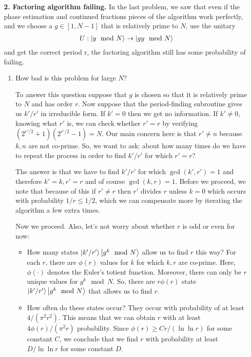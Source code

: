 \documentclass{article}
\theoremstyle{definition}
\begin{document}
\newpage

\noindent \textbf{2. Factoring algorithm failing.} In the last problem, we saw that even if the phase estimation and continued fractions pieces of the algorithm work perfectly, and we choose a  $g\in [1,N-1]$ that is relatively prime to $N$, use the unitary
\begin{align*}
U : \ket{ y \mod N}  \to \ket{gy \mod N}
\end{align*}
and get the correct period r, the factoring algorithm still has some probability of failing.

\begin{enumerate}[label=(\alph*)]

\item How bad is this problem for large $N$?

\noindent To answer this question suppose that $g$ is chosen so that it is relatively prime to $N$ and has order $r$. Now suppose that the period-finding subroutine gives us $k'/r'$ in irreducible form. If $k'=0$ then we get no information. If $k'\neq 0$, knowing what $r'$ is, we can check whether $r' = r$ by verifying $(2^{r'/2}+1)(2^{r'/2}-1) = N$. Our main concern here is that $r'\neq n$ because $k,n$ are not co-prime. So, we want to ask: about how many times do we have to repeat the process in order to find $k'/r'$ for which $r'=r$? 

The answer is that we have to find $k'/r'$ for which $\gcd(k',r')=1$ and therefore $k'=k, r'=r$ and of course $\gcd(k,r) = 1$. Before we proceed, we note that because of this if $r'\neq r$ then $r'$ divides $r$ unless $k =0$ which occurs with probability $1/r \leq 1/2$, which we can compensate more by iterating the algorithm a few extra times. 

Now we proceed. Also, let's not worry about whether $r$ is odd or even for now:
\begin{itemize}
	\item How many states $\ket{k'/r'}\ket{g^k \mod N}$ allow us to find $r$ this way? For each $r$, there are $\phi(r)$ values for $k$ for which $k,r$ are co-prime. Here, $\phi(\cdot)$ denotes the Euler's totient function. Moreover, there can only be $r$ unique values for $g^k \mod N$. So, there are $r\phi(r)$ state $\ket{k'/r'}\ket{g^k \mod N}$ that allows us to find $r$.
	
	\item How often do these states occur?  They occur with probability of at least $4/(\pi^2 r^2)$. This means that we can obtain $r$ with at least $4\phi(r)/(\pi^2 r)$ probability. Since $\phi(r) \geq Cr/(\ln \ln r)$ for some constant $C$, we conclude that we find $r$ with probability at least $D/ \ln \ln r$ for some constant $D$.
	

\end{itemize}
\end{enumerate}
\end{document}
